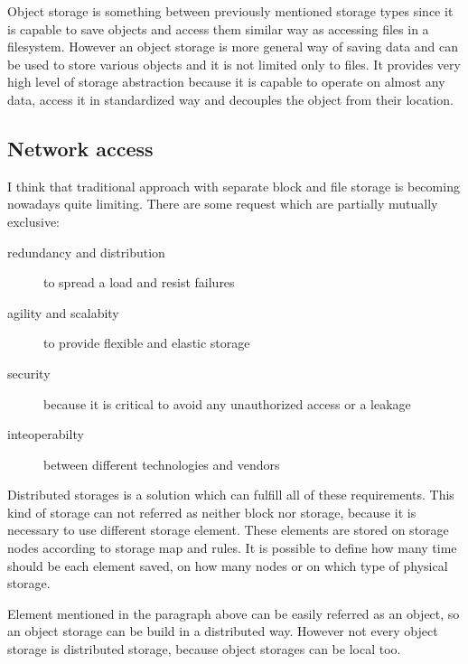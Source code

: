 Object storage is something between previously mentioned storage types since it is capable to save objects and access them similar way as accessing files in a filesystem. However an object storage is more general way of saving data and can be used to store various objects and it is not limited only to files. It provides very high level of storage abstraction because it is capable to operate on almost any data, access it in standardized way and decouples the object from their location.
\label{par:object-storage}


\subsection{Network access}
I think that traditional approach with separate block and file storage is becoming nowadays quite limiting. There are some request which are partially mutually exclusive:
\begin{description}
	\item[redundancy and distribution] to spread a load and resist failures
	\item[agility and scalabity] to provide flexible and elastic storage
	\item[security] because it is critical to avoid any unauthorized access or a leakage
	\item[inteoperabilty] between different technologies and vendors
\end{description}

Distributed storages is a solution which can fulfill all of these requirements. This kind of storage can not referred as neither block nor storage, because it is necessary to use different storage element. These elements are stored on storage nodes according to storage map and rules. It is possible to define how many time should be each element saved, on how many nodes or on which type of physical storage.

Element mentioned in the paragraph above can be easily referred as an object, so an object storage can be build in a distributed way. However not every object storage is distributed storage, because object storages can be local too.

